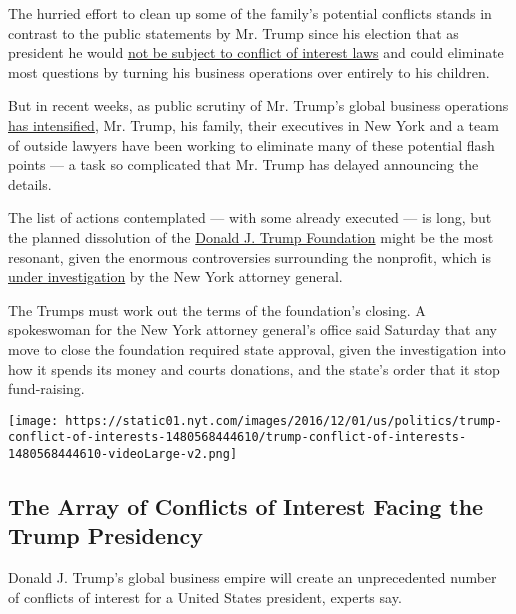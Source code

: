The hurried effort to clean up some of the family's potential conflicts
stands in contrast to the public statements by Mr. Trump since his
election that as president he would
\href{http://www.nytimes.com/2016/11/23/us/politics/trump-new-york-times-interview-transcript.html}{not
be subject to conflict of interest laws} and could eliminate most
questions by turning his business operations over entirely to his
children.

But in recent weeks, as public scrutiny of Mr. Trump's global business
operations
\href{http://www.nytimes.com/2016/11/26/us/politics/donald-trump-international-business.html}{has
intensified}, Mr. Trump, his family, their executives in New York and a
team of outside lawyers have been working to eliminate many of these
potential flash points --- a task so complicated that Mr. Trump has
delayed announcing the details.

The list of actions contemplated --- with some already executed --- is
long, but the planned dissolution of the
\href{https://www.charitynavigator.org/index.cfm?bay=search.summary\&orgid=16764}{Donald
J. Trump Foundation} might be the most resonant, given the enormous
controversies surrounding the nonprofit, which is
\href{http://www.nytimes.com/2016/10/04/us/politics/trump-foundation-money.html}{under
investigation} by the New York attorney general.

The Trumps must work out the terms of the foundation's closing. A
spokeswoman for the New York attorney general's office said Saturday
that any move to close the foundation required state approval, given the
investigation into how it spends its money and courts donations, and the
state's order that it stop fund-raising.

\href{https://www.nytimes.com/interactive/2016/12/01/us/politics/trump-conflict-of-interests.html}{}

\texttt{[image: https://static01.nyt.com/images/2016/12/01/us/politics/trump-conflict-of-interests-1480568444610/trump-conflict-of-interests-1480568444610-videoLarge-v2.png]}

\hypertarget{the-array-of-conflicts-of-interest-facing-the-trump-presidency}{%
\subsection{The Array of Conflicts of Interest Facing the Trump
Presidency}\label{the-array-of-conflicts-of-interest-facing-the-trump-presidency}}

Donald J. Trump's global business empire will create an unprecedented
number of conflicts of interest for a United States president, experts
say.

